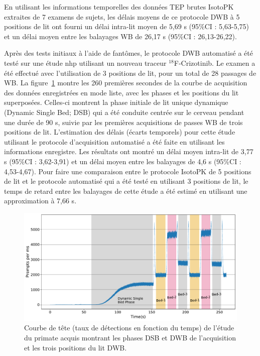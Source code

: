 \documentclass[a4paper]{article}
\begin{document}
En utilisant les informations temporelles des données TEP brutes IsotoPK extraites de 7 examens de sujets, les délais moyens de ce protocole DWB à 5 positions de lit ont fourni un délai intra-lit moyen de 5,69 s (95\%CI : 5,63-5,75) et un délai moyen entre les balayages WB de 26,17 s (95\%CI : 26,13-26,22).
 
Après des tests initiaux à l'aide de fantômes, le protocole DWB automatisé a été testé sur une étude \gls{nhp} utilisant un nouveau traceur $^{18}$F-Crizotinib. Le examen a été effectué avec l'utilisation de 3 positions de lit, pour un total de 28 passages de WB.
La figure~\ref{fig3_1:Macaque_Head_Curve_Phases} montre les 260 premières secondes de la courbe de acquisition des données enregistrées en mode liste, avec les phases et les positions du lit superposées. Celles-ci montrent la phase initiale de lit unique dynamique (Dynamic Single Bed; DSB) qui a été conduite centrée sur le cerveau
pendant une durée de 90 s, suivie par les premières acquisitions de passes WB de trois positions de lit.
L'estimation des délais (écarts temporels) pour cette étude utilisant le protocole d'acquisition automatisé a été faite en utilisant les informations enregistre. Les résultats ont montré un délai moyen intra-lit de 3,77 s (95\%CI : 3,62-3,91) et un délai moyen entre les balayages de 4,6 s (95\%CI : 4,53-4,67). 
Pour faire une comparaison entre le protocole IsotoPK de 5 positions de lit et le protocole automatisé qui a été testé en utilisant 3 positions de lit, le temps de retard entre les balayages de cette étude a été estimé en utilisant une approximation à 7,66 s.

\begin{figure} [ht!]
\centering
\includegraphics[scale=0.45,angle=0]{3_1_Macaque_Head_curve_Phases.pdf}
\caption{Courbe de tête (taux de détections en fonction du temps) de l'étude du primate acquis montrant les phases DSB et DWB de l'acquisition et les trois positions du lit DWB.}
\label{fig3_1:Macaque_Head_Curve_Phases}
\end{figure}
\end{document}
